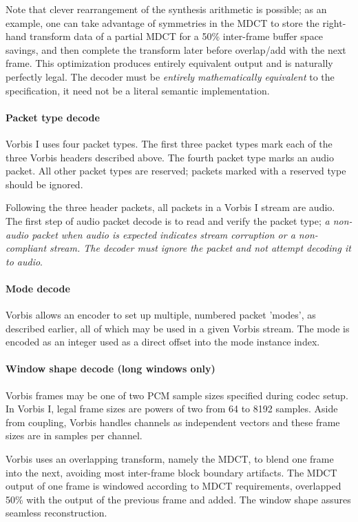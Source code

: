 Note that clever rearrangement of the synthesis arithmetic is
possible; as an example, one can take advantage of symmetries in the
MDCT to store the right-hand transform data of a partial MDCT for a
50\% inter-frame buffer space savings, and then complete the transform
later before overlap/add with the next frame.  This optimization
produces entirely equivalent output and is naturally perfectly legal.
The decoder must be \emph{entirely mathematically equivalent} to the
specification, it need not be a literal semantic implementation.

\paragraph{Packet type decode}

Vorbis I uses four packet types. The first three packet types mark each
of the three Vorbis headers described above. The fourth packet type
marks an audio packet. All other packet types are reserved; packets
marked with a reserved type should be ignored.

Following the three header packets, all packets in a Vorbis I stream
are audio.  The first step of audio packet decode is to read and
verify the packet type; \emph{a non-audio packet when audio is expected
indicates stream corruption or a non-compliant stream. The decoder
must ignore the packet and not attempt decoding it to
audio}.




\paragraph{Mode decode}
Vorbis allows an encoder to set up multiple, numbered packet 'modes',
as described earlier, all of which may be used in a given Vorbis
stream. The mode is encoded as an integer used as a direct offset into
the mode instance index.


\paragraph{Window shape decode (long windows only)} \label{vorbis:spec:window}

Vorbis frames may be one of two PCM sample sizes specified during
codec setup.  In Vorbis I, legal frame sizes are powers of two from 64
to 8192 samples.  Aside from coupling, Vorbis handles channels as
independent vectors and these frame sizes are in samples per channel.

Vorbis uses an overlapping transform, namely the MDCT, to blend one
frame into the next, avoiding most inter-frame block boundary
artifacts.  The MDCT output of one frame is windowed according to MDCT
requirements, overlapped 50\% with the output of the previous frame and
added.  The window shape assures seamless reconstruction.

